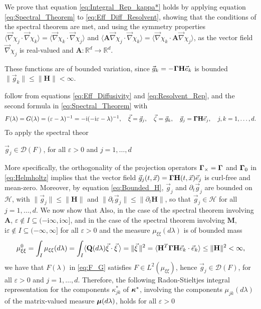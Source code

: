 \documentclass[11pt]{amsart}
\newcommand{\I}{\mathrm{i}}
\newcommand{\Mb}{\mathbf{M}}
\newcommand{\Hb}{\mathbf{H}}
\newcommand{\Ab}{\mathbf{A}}
\newcommand{\Qb}{\mathbf{Q}}
\newcommand{\Hs}{\mathscr{H}}
\newcommand\bmu{\mbox{\boldmath${\mu}$}}
\newcommand\bkappa{\mbox{\boldmath${\kappa}$}}
\newcommand\bGamma{\mbox{\boldmath${\Gamma}$}}
\begin{document}
We prove that equation \eqref{eq:Integral_Rep_kappa*} holds by
applying equation \eqref{eq:Spectral_Theorem} to
\eqref{eq:Eff_Diff_Resolvent}, showing that the conditions of the
spectral theorem are met, and using the symmetry properties
$\langle\vec{\nabla}\chi_j\cdot\vec{\nabla}\chi_k\rangle=\langle\vec{\nabla}\chi_k\cdot\vec{\nabla}\chi_j\rangle$ and
$\langle\Ab\vec{\nabla}\chi_j\cdot\vec{\nabla}\chi_k\rangle=\langle\vec{\nabla}\chi_k\cdot\Ab\vec{\nabla}\chi_j\rangle$, as the vector
field $\vec{\nabla}\chi_j$ is real-valued and
$\Ab:\mathbb{R}^d\to\mathbb{R}^d$. 


These functions are of bounded variation, since
$\vec{g}_k=-\bGamma\Hb\vec{e}_k$ is bounded
$\|\vec{g}_k\|\leq\|\Hb\|<\infty$.


follow from equations \eqref{eq:Eff_Diffusivity} and
\eqref{eq:Resolvent_Rep}, and the second formula in
\eqref{eq:Spectral_Theorem} with   
\begin{align}\label{eq:F_G}
  F(\lambda)=G(\lambda)=(\varepsilon-\lambda)^{-1}=-\I(-\I\varepsilon-\lambda)^{-1}, \quad
  \vec{\xi}=\vec{g}_j, \quad
  \vec{\zeta}=\vec{g}_k, \quad
  \vec{g}_j=\bGamma\Hb\vec{e}_j,
  \quad  j,k=1,\ldots,d.
\end{align}
%
To apply the spectral theor


$\vec{g}_j\in\mathscr{D}(F)$, for all $\varepsilon>0$ and $j=1,\ldots,d$


More specifically, the orthogonality of the projection operators
$\bGamma_\times=\bGamma$ and $\bGamma_0$ in \eqref{eq:Helmholtz} implies
that the vector field
$\vec{g}_j(t,\vec{x})=\bGamma\Hb(t,\vec{x})\vec{e}_j$ is curl-free and
mean-zero. Moreover, by equation \eqref{eq:Bounded_H}, $\vec{g}_j$
and $\partial_t\vec{g}_j$ are bounded on $\Hs$, with $\|\vec{g}_j\|\leq\|\Hb\|$ and
$\|\partial_t\vec{g}_j\|\leq\|\partial_t\Hb\|$, so that $\vec{g}_j\in\Hs$ for all
$j=1,\ldots,d$. We now show that Also, in the case of the spectral theorem involving $\Ab$,
$\varepsilon\not\in I\subseteq(-\I\infty,\I\infty]$, and in the case of the spectral theorem
involving $\Mb$, $\I\varepsilon\not\in I\subseteq(-\infty,\infty]$ for all $\varepsilon>0$ and the measure
$\mu_{\xi\xi}(d\lambda)$ is of bounded mass \cite{Stone:64}  
%
\begin{align}\label{eq:Mass}
  \mu^0_{\xi\xi}=\int_I\mu_{\xi\xi}(d\lambda)
        =\int_I\langle\Qb(d\lambda)\vec{\xi}\cdot\vec{\xi}\,\rangle   
       =\|\vec{\xi}\,\|^2
       =\langle\Hb^T\bGamma\Hb\vec{e}_k\cdot\vec{e}_k\rangle
       \leq\|\Hb\|^2<\infty,
\end{align}
%
we have that $F(\lambda)$ in \eqref{eq:F_G} satisfies $F\in L^2(\mu_{\xi\xi})$, hence 
$\vec{g}_j\in\mathscr{D}(F)$, for all $\varepsilon>0$ and $j=1,\ldots,d$. Therefore, the 
following Radon-Stieltjes integral representation for the components
$\kappa^*_{jk}$ of $\bkappa^*$, involving the components $\mu_{jk}(d\lambda)$ of
the matrix-valued measure $\bmu(d\lambda)$, holds for all $\varepsilon>0$
\end{document}
